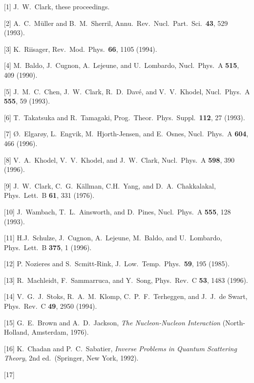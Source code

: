 \item{[1]}
J.\ W.\ Clark, these proceedings.
\item{[2]}
A.\ C.\ M\"{u}ller and B.\ M.\ Sherril, Annu.\ Rev.\ Nucl.\ 
Part.\ Sci.\ {\bf 43}, 529 (1993).
\item{[3]}
K.\ Riisager, Rev.\ Mod.\ Phys.\ {\bf 66}, 1105 (1994).
\item{[4]}
M.\ Baldo, J.\ Cugnon, A.\ Lejeune, and U.\ Lombardo, 
Nucl.\ Phys.\ A {\bf 515}, 409 (1990).
\item{[5]}
J.\ M.\ C.\ Chen, J.\ W.\ Clark, R.\ D.\ Dav\'{e}, and 
V.\ V.\ Khodel, Nucl.\ Phys.\ A {\bf 555}, 59 (1993).
\item{[6]}
T.\ Takatsuka and R.\ Tamagaki, Prog.\ Theor.\ Phys.\ 
Suppl.\ {\bf 112}, 27 (1993).
\item{[7]}
\O.\ Elgar\o y, L.\ Engvik, M.\ Hjorth-Jensen, and E.\ Osnes, 
Nucl.\ Phys.\ A {\bf 604}, 466 (1996).
\item{[8]}
V.\ A.\ Khodel, V.\ V.\ Khodel, and J.\ W.\ Clark, 
Nucl.\ Phys.\ A {\bf 598}, 390 (1996).
\item{[9]}
J.\ W.\ Clark, C.\ G.\ K\"{a}llman, C.\-H.\ Yang, and 
D.\ A.\ Chakkalakal, Phys.\ Lett.\ B {\bf 61}, 331 (1976).
\item{[10]}
J.\ Wambach, T.\ L.\ Ainsworth, and D.\ Pines, Nucl.\ Phys.\ 
A {\bf 555}, 128 (1993).
\item{[11]}
H.\-J.\ Schulze, J.\ Cugnon, A.\ Lejeune, M.\ Baldo, 
and U.\ Lombardo, Phys.\ Lett.\ B {\bf 375}, 1 (1996).
\item{[12]}
P. Nozieres and S.\ Scmitt-Rink, J.\ Low.\ Temp.\ Phys.\ {\bf 59}, 195 (1985).
\item{[13]}
R.\ Machleidt, F.\ Sammarruca, and Y.\ Song, Phys.\ Rev.\ C 
{\bf 53}, 1483 (1996).
\item{[14]}
V.\ G.\ J.\ Stoks, R.\ A.\ M.\ Klomp, C.\ P.\ F.\ Terheggen, and 
J.\ J.\ de Swart, Phys.\ Rev.\ C {\bf 49}, 2950 (1994).
\item{[15]}
G.\ E.\ Brown and A.\ D.\ Jackson, {\it The Nucleon-Nucleon 
Interaction} (North-Holland, Amsterdam, 1976).
\item{[16]}
K.\ Chadan and P.\ C.\ Sabatier, {\it Inverse Problems in 
Quantum Scattering Theory}, 2nd ed.\ (Springer, New York, 1992).
\item{[17]}
